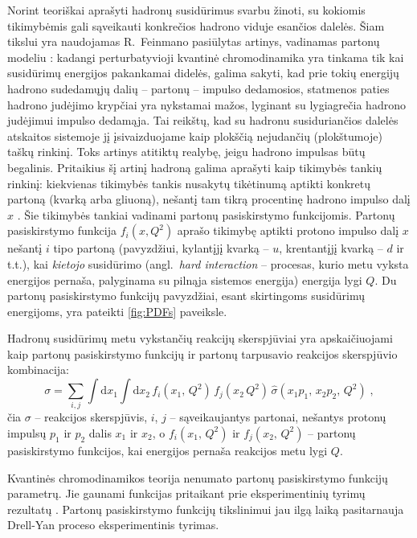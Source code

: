 \documentclass[a4paper, 12pt, oneside]{article}
\newlength\q
\begin{document}
Norint teoriškai aprašyti hadronų susidūrimus svarbu žinoti, su kokiomis tikimybėmis gali sąveikauti konkrečios
hadrono viduje esančios dalelės.
Šiam tikslui yra naudojamas R.\ Feinmano pasiūlytas artinys, vadinamas partonų modeliu \cite{FeynPartons}:
kadangi perturbatyvioji kvantinė chromodinamika yra tinkama tik kai susidūrimų energijos pakankamai didelės,
galima sakyti, kad prie tokių energijų hadrono sudedamųjų dalių -- partonų -- impulso dedamosios, statmenos paties
hadrono judėjimo krypčiai yra nykstamai mažos, lyginant su lygiagrečia hadrono judėjimui impulso dedamąja.
Tai reikštų, kad su hadronu susiduriančios dalelės atskaitos sistemoje jį įsivaizduojame kaip plokščią nejudančių
(plokštumoje) taškų rinkinį.
Toks artinys atitiktų realybę, jeigu hadrono impulsas būtų begalinis.
Pritaikius šį artinį hadroną galima aprašyti kaip tikimybės tankių rinkinį: kiekvienas tikimybės tankis nusakytų tikėtinumą
aptikti konkretų partoną (kvarką arba gliuoną), nešantį tam tikrą procentinę hadrono impulso dalį $x$ \cite{BjorkPartons}.
Šie tikimybės tankiai vadinami partonų pasiskirstymo funkcijomis.
Partonų pasiskirstymo funkcija $f_{i}(x, Q^{2})$ aprašo tikimybę aptikti protono impulso
dalį $x$ nešantį $i$ tipo partoną (pavyzdžiui, kylantįjį kvarką -- $u$, krentantįjį
kvarką -- $d$ ir t.t.), kai \textit{kietojo} susidūrimo (angl.\ \textit{hard interaction} --
procesas, kurio metu vyksta energijos pernaša, palyginama su pilnąja sistemos energija) energija lygi $Q$.
Du partonų pasiskirstymo funkcijų pavyzdžiai, esant skirtingoms susidūrimų energijoms, yra pateikti
\ref{fig:PDFs} paveiksle.

Hadronų susidūrimų metu vykstančių reakcijų skerspjūviai yra apskaičiuojami kaip partonų pasiskirstymo
funkcijų ir partonų tarpusavio reakcijos skerspjūvio kombinacija:
\begin{equation}
	\sigma = \sum_{i, j} \int \mathrm{d}x_1 \int \mathrm{d}x_2 \,
	f_{i}(x_1, \, Q^2) \, f_{j}(x_2 \, Q^2) \, \hat{\sigma}(x_1 p_1, \, x_2 p_2, \, Q^2) \; \mathrm{,}
	\label{eq:PDFxsec}
\end{equation}
čia $\sigma$ -- reakcijos skerspjūvis, $i$, $j$ -- sąveikaujantys partonai, nešantys protonų impulsų $p_1$ ir $p_2$
dalis $x_1$ ir $x_2$, o $f_{i}(x_1, \, Q^2)$ ir $f_{j}(x_2, \, Q^2)$ -- partonų pasiskirstymo funkcijos, kai
energijos pernaša reakcijos metu lygi $Q$.

Kvantinės chromodinamikos teorija nenumato partonų pasiskirstymo funkcijų parametrų.
Jie gaunami funkcijas pritaikant prie eksperimentinių tyrimų rezultatų \cite{NNPDF, PDF_ABMP16, CTEQ2019}.
Partonų pasiskirstymo funkcijų tikslinimui jau ilgą laiką pasitarnauja Drell-Yan proceso eksperimentinis
tyrimas. 
\end{document}
